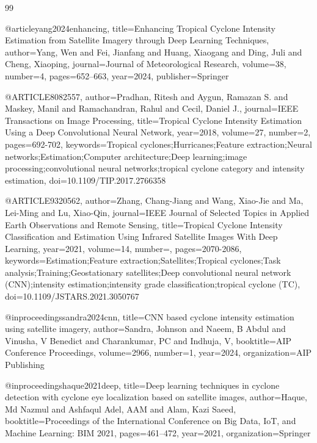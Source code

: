 \begin{thebibliography}{99}

@article{yang2024enhancing,
  title={Enhancing Tropical Cyclone Intensity Estimation from Satellite Imagery through Deep Learning Techniques},
  author={Yang, Wen and Fei, Jianfang and Huang, Xiaogang and Ding, Juli and Cheng, Xiaoping},
  journal={Journal of Meteorological Research},
  volume={38},
  number={4},
  pages={652--663},
  year={2024},
  publisher={Springer}
}

@ARTICLE{8082557,
  author={Pradhan, Ritesh and Aygun, Ramazan S. and Maskey, Manil and Ramachandran, Rahul and Cecil, Daniel J.},
  journal={IEEE Transactions on Image Processing}, 
  title={Tropical Cyclone Intensity Estimation Using a Deep Convolutional Neural Network}, 
  year={2018},
  volume={27},
  number={2},
  pages={692-702},
  keywords={Tropical cyclones;Hurricanes;Feature extraction;Neural networks;Estimation;Computer architecture;Deep learning;image processing;convolutional neural networks;tropical cyclone category and intensity estimation},
  doi={10.1109/TIP.2017.2766358}}


@ARTICLE{9320562,
  author={Zhang, Chang-Jiang and Wang, Xiao-Jie and Ma, Lei-Ming and Lu, Xiao-Qin},
  journal={IEEE Journal of Selected Topics in Applied Earth Observations and Remote Sensing}, 
  title={Tropical Cyclone Intensity Classification and Estimation Using Infrared Satellite Images With Deep Learning}, 
  year={2021},
  volume={14},
  number={},
  pages={2070-2086},
  keywords={Estimation;Feature extraction;Satellites;Tropical cyclones;Task analysis;Training;Geostationary satellites;Deep convolutional neural network (CNN);intensity estimation;intensity grade classification;tropical cyclone (TC)},
  doi={10.1109/JSTARS.2021.3050767}}

@inproceedings{sandra2024cnn,
  title={CNN based cyclone intensity estimation using satellite imagery},
  author={Sandra, Johnson and Naeem, B Abdul and Vinusha, V Benedict and Charankumar, PC and Indhuja, V},
  booktitle={AIP Conference Proceedings},
  volume={2966},
  number={1},
  year={2024},
  organization={AIP Publishing}
}

@inproceedings{haque2021deep,
  title={Deep learning techniques in cyclone detection with cyclone eye localization based on satellite images},
  author={Haque, Md Nazmul and Ashfaqul Adel, AAM and Alam, Kazi Saeed},
  booktitle={Proceedings of the International Conference on Big Data, IoT, and Machine Learning: BIM 2021},
  pages={461--472},
  year={2021},
  organization={Springer}
}


\end{thebibliography}
